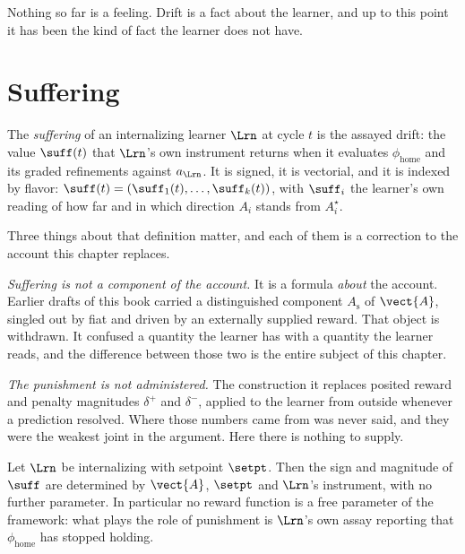Nothing so far is a feeling.
Drift is a fact about the learner, and up to this point it has been the
kind of fact the learner does not have.

\section{Suffering}
\label{suf:S3}

\begin{definition}[Suffering]
\label{suf:def:suffering}
The \emph{suffering} of an internalizing learner $\Lrn$ at cycle $t$ is
the assayed drift: the value $\suff(t)$ that $\Lrn$'s own instrument
returns when it evaluates $\phi_{\mathrm{home}}$ and its graded
refinements against $a_\Lrn$.
It is signed, it is vectorial, and it is indexed by flavor:
$\suff(t) = (\suff_1(t),\ldots,\suff_k(t))$, with $\suff_i$ the learner's
own reading of how far and in which direction $A_i$ stands from
$A^\star_i$.
\end{definition}

Three things about that definition matter, and each of them is a
correction to the account this chapter replaces.

\emph{Suffering is not a component of the account.}
It is a formula \emph{about} the account.
Earlier drafts of this book carried a distinguished component
$A_{\mathrm{s}}$ of $\vect{A}$, singled out by fiat and driven by an
externally supplied reward.
That object is withdrawn.
It confused a quantity the learner has with a quantity the learner reads,
and the difference between those two is the entire subject of this
chapter.

\emph{The punishment is not administered.}
The construction it replaces posited reward and penalty magnitudes
$\delta^+$ and $\delta^-$, applied to the learner from outside whenever a
prediction resolved.
Where those numbers came from was never said, and they were the weakest
joint in the argument.
Here there is nothing to supply.

\begin{proposition}
\label{suf:prop:derived}
Let $\Lrn$ be internalizing with setpoint $\setpt$.
Then the sign and magnitude of $\suff$ are determined by
$\vect{A}$, $\setpt$ and $\Lrn$'s instrument, with no further parameter.
In particular no reward function is a free parameter of the framework:
what plays the role of punishment is $\Lrn$'s own assay reporting that
$\phi_{\mathrm{home}}$ has stopped holding.
\end{proposition}

